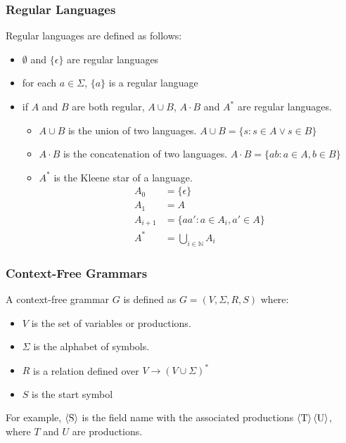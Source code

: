 \subsubsection{Regular Languages}
Regular languages are defined as follows:
\begin{multicols}{2}
\begin{itemize}
\item $\emptyset$ and $\{\epsilon\}$ are regular languages
\item for each $a\in\Sigma$, $\{a\}$ is a regular language
\item if $A$ and $B$ are both regular, $A\cup B$, $A\cdot B$ and $A^*$ are regular languages.
	\begin{itemize}
\item $A\cup B$ is the union of two languages.  $A\cup B = \{s : s\in A \lor s \in B\}$
\item $A\cdot B$ is the concatenation of two languages.  $A\cdot B = \{ ab : a \in A, b \in B\}$
\item $A^*$ is the Kleene star of a language.
\begin{align*}
    A_0&=\{\epsilon\}\\
    A_1&= A\\
    A_{i+1} &= \{ aa' : a \in A_i, a'\in A\}\\
    A^* &= \bigcup_{i\in\mathbb N} A_i
\end{align*}
	\end{itemize}
\end{itemize}
\end{multicols}

\subsubsection{Context-Free Grammars}
A context-free grammar $G$ is defined as $G=\left(V,\Sigma, R,S\right)$ where:
\begin{multicols}{2}
\begin{itemize}
\item $V$ is the set of variables or productions.
\item $\Sigma$ is the alphabet of symbols.
\item $R$ is a relation defined over $V\rightarrow \left(V\cup\Sigma\right)^*$
\item $S$ is the start symbol
\end{itemize}
\end{multicols}

For example, $\langle \text S \rangle$ is the field name with the associated
productions $\langle \text T \rangle \, \langle \text U \rangle$, where $T$ and
$U$ are productions.

